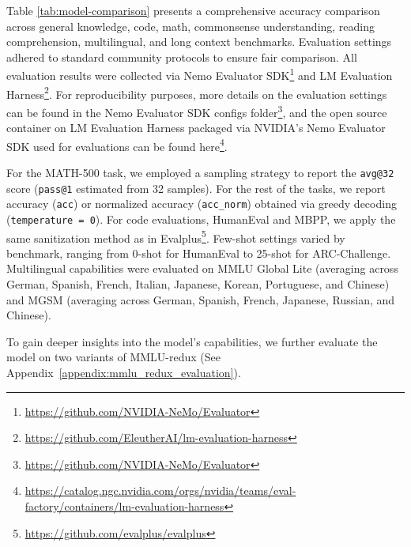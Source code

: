 Table \ref{tab:model-comparison} presents a comprehensive accuracy comparison across general knowledge, code, math, commonsense understanding, reading comprehension, multilingual, and long context benchmarks. Evaluation settings adhered to standard community protocols to ensure fair comparison. All evaluation results were collected via Nemo Evaluator SDK\footnote{\url{https://github.com/NVIDIA-NeMo/Evaluator}} and LM Evaluation Harness\footnote{\url{https://github.com/EleutherAI/lm-evaluation-harness}}. For reproducibility purposes, more details on the evaluation settings can be found in the Nemo Evaluator SDK configs folder\footnote{\url{https://github.com/NVIDIA-NeMo/Evaluator}}, and the open source container on LM Evaluation Harness packaged via NVIDIA's Nemo Evaluator SDK used for evaluations can be found here\footnote{\url{https://catalog.ngc.nvidia.com/orgs/nvidia/teams/eval-factory/containers/lm-evaluation-harness}}.

For the MATH-500 task, we employed a sampling strategy to report the \texttt{avg@32} score (\texttt{pass@1} estimated from 32 samples). For the rest of the tasks, we report accuracy (\texttt{acc}) or normalized accuracy (\texttt{acc\_norm}) obtained via greedy decoding (\texttt{temperature = 0}). For code evaluations, HumanEval and MBPP, we apply the same sanitization method as in Evalplus\footnote{\url{https://github.com/evalplus/evalplus}}. Few-shot settings varied by benchmark, ranging from 0-shot for HumanEval to 25-shot for ARC-Challenge. Multilingual capabilities were evaluated on MMLU Global Lite (averaging across German, Spanish, French, Italian, Japanese, Korean, Portuguese, and Chinese) and MGSM (averaging across German, Spanish, French, Japanese, Russian, and Chinese).

To gain deeper insights into the model’s capabilities, we further evaluate the model on two variants of MMLU-redux (See Appendix~\ref{appendix:mmlu_redux_evaluation}).

